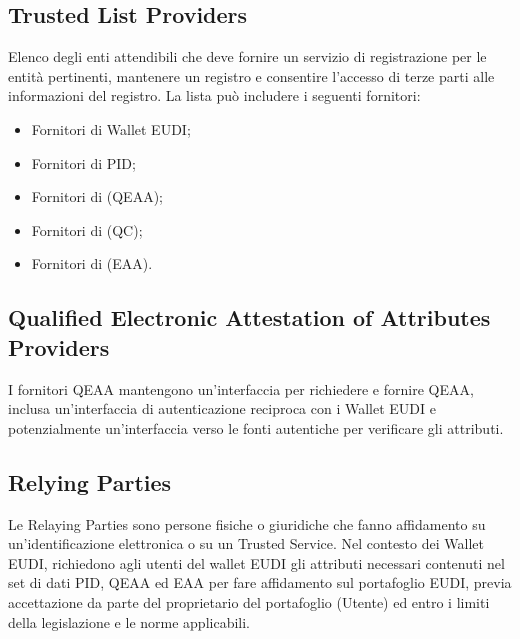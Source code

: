 \subsection{Trusted List Providers}
Elenco degli enti attendibili che deve fornire un servizio di registrazione per le entità pertinenti, mantenere un registro e consentire l'accesso di terze parti alle informazioni del registro.
La lista può includere i seguenti fornitori:
\begin{itemize}
    \item Fornitori di Wallet EUDI;
    \item Fornitori di PID;
    \item Fornitori di (QEAA);
    \item Fornitori di (QC);
    \item Fornitori di (EAA).
\end{itemize}
\subsection{Qualified Electronic Attestation of Attributes Providers}
I fornitori QEAA mantengono un'interfaccia per richiedere e fornire QEAA, inclusa un'interfaccia di autenticazione reciproca con i Wallet EUDI e potenzialmente un'interfaccia verso le fonti autentiche per verificare gli attributi.
\subsection{Relying Parties}
Le Relaying Parties sono persone fisiche o giuridiche che fanno affidamento su un'identificazione elettronica o su un Trusted Service.
Nel contesto dei Wallet EUDI, richiedono agli utenti del wallet EUDI gli attributi necessari contenuti nel set di dati PID, QEAA ed EAA per fare affidamento sul portafoglio EUDI, previa accettazione da parte del proprietario del portafoglio (Utente) ed entro i limiti della legislazione e le norme applicabili.
